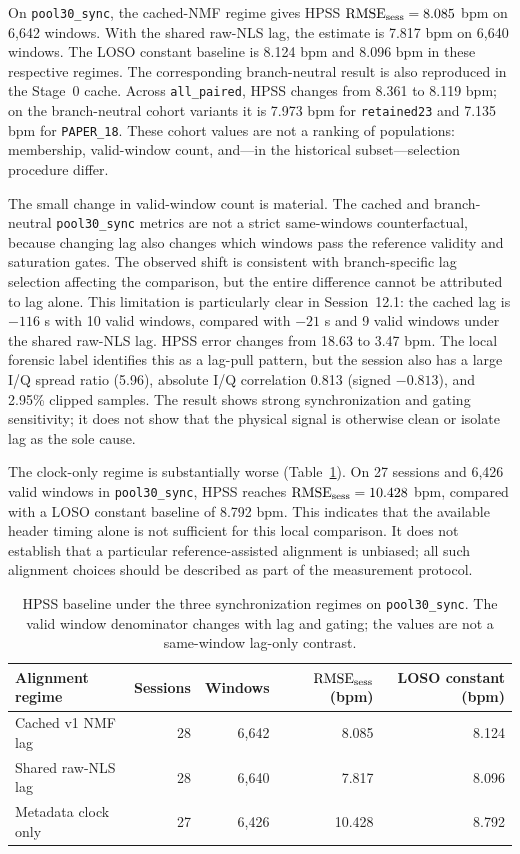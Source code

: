 On \texttt{pool30\_sync}, the cached-NMF regime gives HPSS $\mathrm{RMSE}_{\mathrm{sess}}=8.085$ bpm on 6,642 windows. With
the shared raw-NLS lag, the estimate is 7.817 bpm on 6,640 windows. The LOSO constant baseline is
8.124 bpm and 8.096 bpm in these respective regimes. The corresponding branch-neutral result is
also reproduced in the Stage~0 cache. Across \texttt{all\_paired}, HPSS changes from 8.361 to 8.119 bpm;
on the branch-neutral cohort variants it is 7.973 bpm for \texttt{retained23} and 7.135 bpm for
\texttt{PAPER\_18}. These cohort values are not a ranking of populations: membership, valid-window count,
and---in the historical subset---selection procedure differ.

The small change in valid-window count is material. The cached and branch-neutral \texttt{pool30\_\allowbreak sync}
metrics are not a strict same-windows counterfactual, because changing lag also changes which
windows pass the reference validity and saturation gates. The observed shift is consistent with
branch-specific lag selection affecting the comparison, but the entire difference cannot be
attributed to lag alone. This limitation is particularly clear in Session~12.1: the cached lag is
$-116$ s with 10 valid windows, compared with $-21$ s and 9 valid windows under the shared
raw-NLS lag. HPSS error changes from 18.63 to 3.47 bpm. The local forensic label identifies this
as a lag-pull pattern, but the session also has a large I/Q spread ratio (5.96), absolute I/Q
correlation 0.813 (signed $-0.813$), and 2.95\% clipped samples. The result shows strong synchronization and gating sensitivity;
it does not show that the physical signal is otherwise clean or isolate lag as the sole cause.

The clock-only regime is substantially worse (Table~\ref{tab:ch3_lag_regimes}). On 27 sessions and 6,426 valid windows in
\texttt{pool30\_sync}, HPSS reaches $\mathrm{RMSE}_{\mathrm{sess}}=10.428$ bpm, compared with a LOSO constant baseline of
8.792 bpm. This indicates that the available header timing alone is not sufficient for this local
comparison. It does not establish that a particular reference-assisted alignment is unbiased;
all such alignment choices should be described as part of the measurement protocol.

\begin{table}[htbp]
  \centering
  \small
  \caption{HPSS baseline under the three synchronization regimes on \texttt{pool30\_sync}. The valid
  window denominator changes with lag and gating; the values are not a same-window lag-only
  contrast.}
  \label{tab:ch3_lag_regimes}
  \begin{tabular}{@{}lrrrr@{}}
    \toprule
    Alignment regime & Sessions & Windows & $\mathrm{RMSE}_{\mathrm{sess}}$ (bpm) & LOSO constant (bpm) \\
    \midrule
    Cached v1 NMF lag & 28 & 6,642 & 8.085 & 8.124 \\
    Shared raw-NLS lag & 28 & 6,640 & 7.817 & 8.096 \\
    Metadata clock only & 27 & 6,426 & 10.428 & 8.792 \\
    \bottomrule
  \end{tabular}
\end{table}

